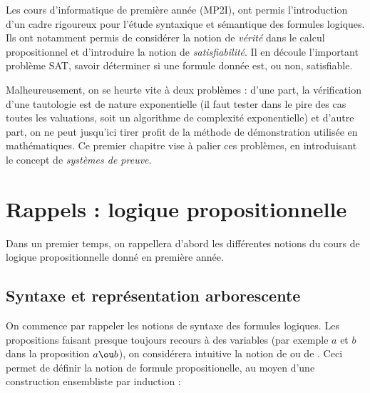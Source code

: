     Les cours d'informatique de première année (\textsf{MP2I}), ont permis l'introduction d'un cadre rigoureux pour l'étude syntaxique et sémantique des formules logiques. Ils ont notamment permis de considérer la notion de \textit{vérité} dans le calcul propositionnel et d'introduire la notion de \textit{satisfiabilité}. Il en découle l'important problème SAT, \ie savoir déterminer si une formule donnée est, ou non, satisfiable.\newline
    
    Malheureusement, on se heurte vite à deux problèmes : d'une part, la vérification d'une tautologie est de nature exponentielle (il faut tester dans le pire des cas toutes les valuations, soit un algorithme de complexité exponentielle) et d'autre part, on ne peut jusqu'ici tirer profit de la méthode de démonstration utilisée en mathématiques. Ce premier chapitre vise à palier ces problèmes, en introduisant le concept de \textit{systèmes de preuve}. 
    
    \chaptertoc
    
    \section{Rappels : logique propositionnelle}
    
    Dans un premier temps, on rappellera d'abord les différentes notions du cours de logique propositionnelle donné en première année.
    
    \subsection{Syntaxe et représentation arborescente}
    
    On commence par rappeler les notions de syntaxe des formules logiques. Les propositions faisant presque toujours recours à des variables (par exemple $a$ et $b$ dans la proposition $a \ou b$), on considérera intuitive la notion de  ou de . Ceci permet de définir la notion de formule propositionelle, au moyen d'une construction ensembliste par induction :
    
